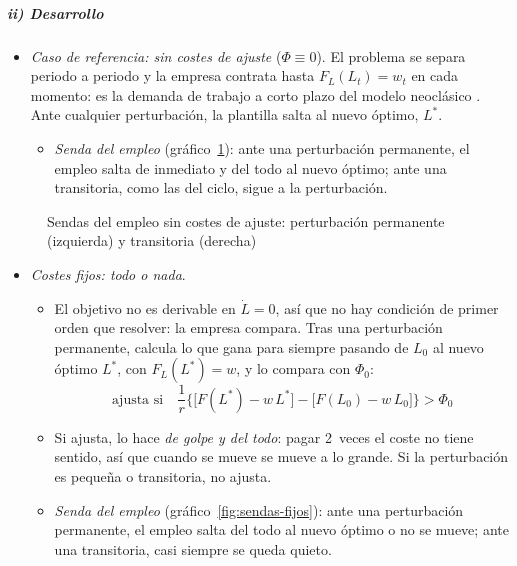 \documentclass[11pt]{article}
\begin{document}
\subparagraph{ii) Desarrollo}

\begin{itemize}
\item \emph{Caso de referencia: sin costes de ajuste} ($\Phi\equiv0$). El problema se separa periodo a periodo y la empresa contrata hasta $F_L(L_t)=w_t$ en cada momento: es la demanda de trabajo a corto plazo del modelo neoclásico . Ante cualquier perturbación, la plantilla salta al nuevo óptimo, $L^*$.
  \begin{itemize}
  \item \emph{Senda del empleo} (gráfico~\ref{fig:sendas-sin-costes}): ante una perturbación permanente, el empleo salta de inmediato y del todo al nuevo óptimo; ante una transitoria, como las del ciclo, sigue a la perturbación.
  \end{itemize}
\end{itemize}

\begin{figure}[H]
\centering
\caption{Sendas del empleo sin costes de ajuste: perturbación permanente (izquierda) y transitoria (derecha)}\label{fig:sendas-sin-costes}
\end{figure}

\begin{itemize}
\item \emph{Costes fijos: todo o nada}.
  \begin{itemize}
  \item El objetivo no es derivable en $\dot L=0$, así que no hay condición de primer orden que resolver: la empresa compara. Tras una perturbación permanente, calcula lo que gana para siempre pasando de $L_0$ al nuevo óptimo $L^*$, con $F_L(L^*)=w$, y lo compara con $\Phi_0$:
    \begin{equation}
    \text{ajusta si}\quad \frac{1}{r}\Big\{\big[F(L^*)-w\,L^*\big]-\big[F(L_0)-w\,L_0\big]\Big\}>\Phi_0\label{eq:ajuste-fijo}
    \end{equation}
  \item Si ajusta, lo hace \emph{de golpe y del todo}: pagar 2~veces el coste no tiene sentido, así que cuando se mueve se mueve a lo grande. Si la perturbación es pequeña o transitoria, no ajusta.
  \item \emph{Senda del empleo} (gráfico~\ref{fig:sendas-fijos}): ante una perturbación permanente, el empleo salta del todo al nuevo óptimo o no se mueve; ante una transitoria, casi siempre se queda quieto.
  \end{itemize}
\end{itemize}
\end{document}
